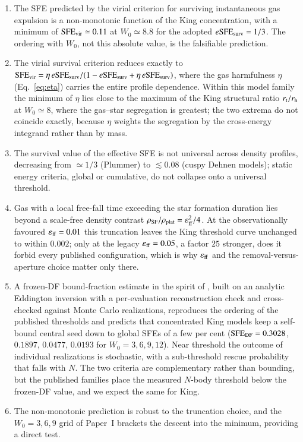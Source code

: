 \documentclass{aa}
\newcommand{\esfe}{e{\rm SFE}}
\newcommand{\sfe}{{\rm SFE}}
\newcommand{\rhalf}{r_{\rm h}}
\newcommand{\rtid}{r_{\rm t}}
\newcommand{\effE}{\varepsilon_{\rm ff}}
\begin{document}
\begin{enumerate}
\item The SFE predicted by the virial criterion for surviving
instantaneous gas expulsion is a non-monotonic function of the King
concentration, with a minimum of $\sfe_{\rm vir}\simeq0.11$ at
$W_0\simeq8.8$ for the adopted $\esfe_{\rm surv}=1/3$. The ordering with
$W_0$, not this absolute value, is the falsifiable prediction.
\item The virial survival criterion reduces exactly to
$\sfe_{\rm vir}=\eta\,\esfe_{\rm surv}/(1-\esfe_{\rm surv}+\eta\,\esfe_{\rm surv})$,
where the gas harmfulness $\eta$ (Eq.~\ref{eq:eta}) carries the entire
profile dependence. Within this model family the minimum of $\eta$ lies
close to the maximum of the King structural ratio $\rtid/\rhalf$ at
$W_0\simeq8$, where the gas--star segregation is greatest; the two
extrema do not coincide exactly, because $\eta$ weights the segregation
by the cross-energy integrand rather than by mass.
\item The survival value of the effective SFE is not universal across density
profiles, decreasing from $\simeq1/3$ (Plummer) to $\lesssim0.08$
(cuspy Dehnen models); static energy criteria, global or cumulative, do
not collapse onto a universal threshold.
\item Gas with a local free-fall time exceeding the star formation
duration lies beyond a scale-free density contrast
$\rho_{\rm SF}/\rho_{\rm plat}=\effE^2/4$. At the observationally
favoured $\effE=0.01$ this truncation leaves the King threshold curve
unchanged to within $0.002$; only at the legacy $\effE=0.05$, a factor
$25$ stronger, does it forbid every published configuration, which is
why $\effE$ and the removal-versus-aperture choice matter only there.
\item A frozen-DF bound-fraction estimate in the spirit of
\citet{Adams2000}, built on an analytic Eddington inversion with a
per-evaluation reconstruction check and cross-checked against Monte Carlo
realizations, reproduces the ordering of the published thresholds and
predicts that concentrated King models keep a self-bound central seed
down to global SFEs of a few per cent ($\sfe_{\rm DF}=0.3028$, $0.1897$,
$0.0477$, $0.0193$ for $W_0=3,6,9,12$). Near threshold the outcome of
individual realizations is stochastic, with a sub-threshold rescue
probability that falls with $N$. The two criteria are complementary
rather than bounding, but the published families place the measured
$N$-body threshold below the frozen-DF value, and we expect the same for
King.
\item The non-monotonic prediction is robust to the truncation choice,
and the $W_0=3,6,9$ grid of Paper~I brackets the descent into the
minimum, providing a direct test.
\end{enumerate}
\end{document}
